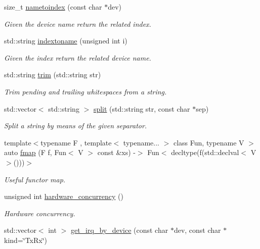 \begin{DoxyCompactItemize}
size\+\_\+t \hyperlink{namespacepfq_aa68a4c07117073eeb820b32f955dda00}{nametoindex} (const char $\ast$dev)
\begin{DoxyCompactList}\small\item\em Given the device name return the related index. \end{DoxyCompactList}\item 
std\+::string \hyperlink{namespacepfq_a7bf753b90ae15e20c86f40ba59c87c36}{indextoname} (unsigned int i)
\begin{DoxyCompactList}\small\item\em Given the index return the related device name. \end{DoxyCompactList}\item 
std\+::string \hyperlink{namespacepfq_a02a1861a64cc518394d3cc4361799c9f}{trim} (std\+::string str)
\begin{DoxyCompactList}\small\item\em Trim pending and trailing whitespaces from a string. \end{DoxyCompactList}\item 
std\+::vector$<$ std\+::string $>$ \hyperlink{namespacepfq_a0c3aeb61dfd544cb08cb240202caf213}{split} (std\+::string str, const char $\ast$sep)
\begin{DoxyCompactList}\small\item\em Split a string by means of the given separator. \end{DoxyCompactList}\item 
{\footnotesize template$<$typename F , template$<$ typename... $>$ class Fun, typename V $>$ }\\auto \hyperlink{namespacepfq_a75e00e20d4294c941fce79c9e884201a}{fmap} (F f, Fun$<$ V $>$ const \&xs) -\/$>$ Fun$<$ decltype(f(std\+::declval$<$ V $>$()))$>$
\begin{DoxyCompactList}\small\item\em Useful functor map. \end{DoxyCompactList}\item 
unsigned int \hyperlink{namespacepfq_a9a9e9be8b77976ed45483448f54de1f9}{hardware\+\_\+concurrency} ()
\begin{DoxyCompactList}\small\item\em Hardware concurrency. \end{DoxyCompactList}\item 
std\+::vector$<$ int $>$ \hyperlink{namespacepfq_ad3359e328bf6619dc4595eadb0d354ba}{get\+\_\+irq\+\_\+by\+\_\+device} (const char $\ast$dev, const char $\ast$kind=\char`\"{}Tx\+Rx\char`\"{})

\end{DoxyCompactItemize}
